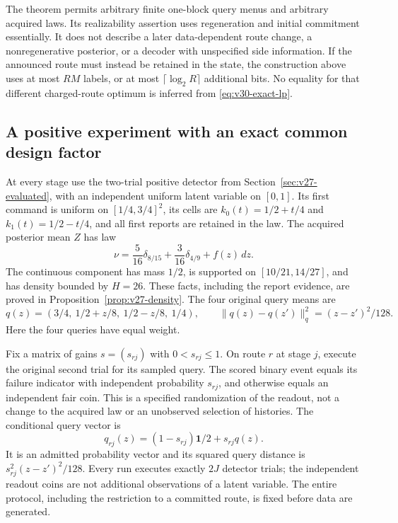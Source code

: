 The theorem permits arbitrary finite one-block query menus and arbitrary
acquired laws. Its realizability assertion uses regeneration and initial
commitment essentially. It does not describe a later data-dependent
route change, a nonregenerative posterior, or a decoder with unspecified
side information. If the announced route must instead be retained in
the state, the construction above uses at most $RM$ labels, or at most
$\lceil\log_2R\rceil$ additional bits. No equality for that different
charged-route optimum is inferred from \eqref{eq:v30-exact-lp}.

\subsection{A positive experiment with an exact common design factor}
At every stage use the two-trial positive detector from
Section~\ref{sec:v27-evaluated}, with an independent uniform latent
variable on $[0,1]$. Its first command is uniform on $[1/4,3/4]^2$,
its cells are $k_0(t)=1/2+t/4$ and $k_1(t)=1/2-t/4$, and all first
reports are retained in the law. The acquired posterior mean $Z$ has
law
\begin{equation}\label{eq:v30-law}
 \nu=\frac5{16}\delta_{8/15}+\frac3{16}\delta_{4/9}+f(z)\,dz.
\end{equation}
The continuous component has mass $1/2$, is supported on
$[10/21,14/27]$, and has density bounded by $H=26$. These facts,
including the report evidence, are proved in
Proposition~\ref{prop:v27-density}. The four original query means are
\[
 q(z)=(3/4,\ 1/2+z/8,\ 1/2-z/8,\ 1/4),\qquad
 \|q(z)-q(z')\|_q^2=(z-z')^2/128.
\]
Here the four queries have equal weight.

Fix a matrix of gains $s=(s_{rj})$ with $0<s_{rj}\le1$. On route $r$
at stage $j$, execute the original second trial for its sampled query.
The scored binary event equals its failure indicator with independent
probability $s_{rj}$, and otherwise equals an independent fair coin.
This is a specified randomization of the readout, not a change to the
acquired law or an unobserved selection of histories. The conditional
query vector is
\begin{equation}\label{eq:v30-attenuation}
 q_{rj}(z)=(1-s_{rj})\mathbf1/2+s_{rj}q(z).
\end{equation}
It is an admitted probability vector and its squared query distance is
$s_{rj}^2(z-z')^2/128$. Every run executes exactly $2J$ detector trials;
the independent readout coins are not additional observations of a
latent variable. The entire protocol, including the restriction to a
committed route, is fixed before data are generated.

